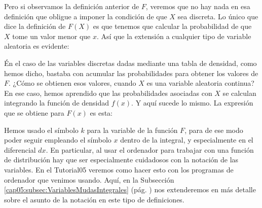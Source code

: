 Pero si observamos la definición anterior de $F$, veremos que no hay nada en esa definición que obligue a imponer la condición de que $X$ sea discreta. Lo único que dice la definición de $F(X)$ es que tenemos que calcular la probabilidad de que $X$ tome un valor menor que $x$. Así que la extensión a cualquier tipo de variable aleatoria es evidente:
    \begin{center}
    \end{center}
Én el caso de las variables discretas dadas mediante una tabla de densidad, como hemos dicho, bastaba con acumular las probabilidades para obtener los valores de $F$. ¿Cómo se obtienen esos valores, cuando $X$ es una variable aleatoria continua? En ese caso, hemos aprendido que las probabilidades asociadas con $X$ se calculan integrando la función de densidad $f(x)$. Y aquí sucede lo mismo. La expresión que se obtiene para $F(x)$ es esta:
    \begin{center}
    \end{center}
Hemos usado el símbolo $k$ para la variable de la función $F$, para de ese modo poder seguir empleando el símbolo $x$ dentro de la integral, y especialmente en el diferencial $dx$. En particular, al usar el ordenador para trabajar con una función de distribución {\sf hay que ser especialmente cuidadosos con la notación de las variables}. En el Tutorial05 veremos como hacer esto con los programas de ordenador que venimos usando. Aquí, en la Subsección \ref{cap05:subsec:VariablesMudasIntegrales} (pág. \pageref{cap05:subsec:VariablesMudasIntegrales}) nos extenderemos en más detalle sobre el asunto de la notación en este tipo de definiciones.

